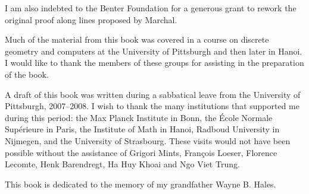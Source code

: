 I am also indebted to the Benter Foundation for a generous grant to
rework the original proof along lines proposed by Marchal.

Much of the material from this book was covered in a course on
discrete geometry and computers at the University of Pittsburgh and
then later in Hanoi.  I would like to thank the members of these
groups for assisting in the preparation of the book.

A draft of this book was written during a sabbatical leave from the
University of Pittsburgh, 2007--2008.  I wish to thank the many
institutions that supported me during this period: the Max Planck
Institute in Bonn, the \'Ecole Normale Sup\'erieure in Paris, the
Institute of Math in Hanoi, Radboud University in Nijmegen, and the
University of Strasbourg.  These visits would not have been possible
without the assistance of Grigori Mints, Fran\c{c}ois Loeser, Florence
Lecomte, Henk Barendregt, Ha Huy Khoai and Ngo Viet Trung.

\bigskip

This book is dedicated to the memory of my grandfather Wayne B. Hales.


